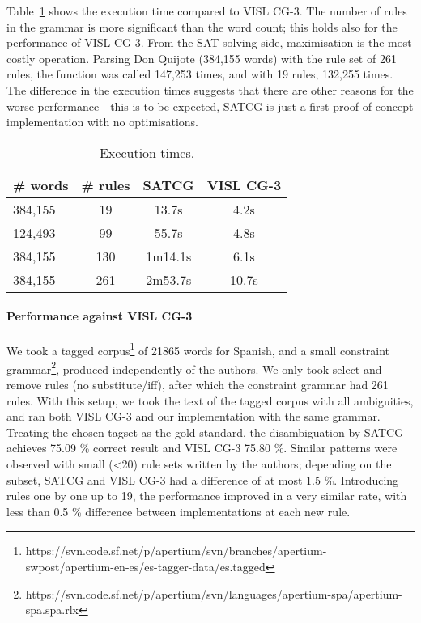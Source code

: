 \documentclass[11pt]{article}
\begin{document}
Table~\ref{table:time} shows the execution time compared to VISL CG-3. 
The number of rules in the grammar is more significant than the word
count; this holds also for the performance of VISL CG-3.
From the SAT solving side, maximisation is the most costly operation.
Parsing Don Quijote (384,155 words) with the rule set of 261 rules,
the function was called 147,253 times, and with 19 rules, 132,255 times.
The difference in the execution times suggests that there are other
reasons for the worse performance---this is to be expected,
SATCG is just a first proof-of-concept implementation with no optimisations.

\begin{table}
  \centering
  \begin{tabular}{|l|c|c|c|}
     \hline
   \textbf{\# words} & \textbf{\# rules} &  \textbf{SATCG} & \textbf{VISL CG-3} \\ \hline
                384,155  & 19   &  13.7s   & 4.2s\\ %
                124,493  & 99   &  55.7s   & 4.8s \\ %
	        384,155  & 130  &  1m14.1s & 6.1s \\ %
                384,155  & 261  &  2m53.7s & 10.7s \\ \hline
  \end{tabular}
  \caption{Execution times.}
  \label{table:time}
\end{table}

\paragraph{Performance against VISL CG-3}


We took a tagged corpus\footnote{https://svn.code.sf.net/p/apertium/svn/branches/apertium-swpost/apertium-en-es/es-tagger-data/es.tagged} of 21865 words for Spanish, 
and a small constraint grammar\footnote{https://svn.code.sf.net/p/apertium/svn/languages/apertium-spa/apertium-spa.spa.rlx}, produced independently of the authors.
We only took select and remove rules (no substitute/iff), after which the constraint grammar had 261 rules.
With this setup, we took the text of the tagged corpus with all ambiguities, and ran both VISL CG-3 and our implementation with the same grammar. 
Treating the chosen tagset as the gold standard, the disambiguation by
SATCG achieves 75.09 \% correct result and VISL CG-3 75.80 \%.
Similar patterns were observed with small (\textless{}20) rule sets written by
the authors; depending on the subset, SATCG and VISL CG-3 had
a difference of at most 1.5 \%. Introducing rules one by one up to 19, the
performance improved in a very similar rate, with less than 0.5 \%
difference between implementations at each new rule.
\end{document}
